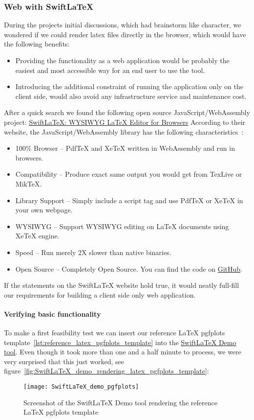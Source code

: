 \subsubsection{Web with SwiftLaTeX}
During the projects initial discussions, which had brainstorm like character, we wondered if we could render latex files directly in the browser, which would have the following benefits:
\begin{itemize}
    \item Providing the functionality as a web application would be probably the easiest and most accessible way for an end user to use the tool.
    \item Introducing the additional constraint of running the application only on the client side, would also avoid any infrastructure service and maintenance cost.
\end{itemize}
After a quick search we found the following open source JavaScript/WebAssembly project: \href{https://www.swiftlatex.com/}{SwiftLaTeX: WYSIWYG LaTeX Editor for Browsers}
According to their website, the JavaScript/WebAssembly library has the following characteristics~\cite{swiftlatex_website}:
\begin{itemize}
    \item 100\% Browser – PdfTeX and XeTeX written in WebAssembly and run in browsers.
    \item Compatibility – Produce exact same output you would get from TexLive or MikTeX\@.
    \item Library Support – Simply include a script tag and use PdfTeX or XeTeX in your own webpage.
    \item WYSIWYG – Support WYSIWYG editing on LaTeX documents using XeTeX engine.
    \item Speed – Run merely 2X slower than native binaries.
    \item Open Source – Completely Open Source. You can find the code on \href{https://github.com/SwiftLaTeX/SwiftLaTeX/}{GitHub}.
\end{itemize}
If the statements on the SwiftLaTeX website hold true, it would neatly full-fill our requirements for building a client side only web application.

\paragraph{Verifying basic functionality}
To make a first feasibility test we can insert our reference LaTeX pgfplots template~\autoref{lst:reference_latex_pgfplots_template} into the \href{https://www.SwiftLaTeX.com/\#demo}{SwiftLaTeX Demo tool}.
Even though it took more than one and a half minute to process, we were very surprised that this just worked, see figure~\autoref{fig:SwiftLaTeX_demo_rendering_latex_pgfplots_template}:
\begin{figure}[H]
    \centering
    \texttt{[image: SwiftLaTeX\_demo\_pgfplots]}
    \caption{Screenshot of the SwiftLaTeX Demo tool rendering the reference LaTeX pgfplots template}\label{fig:SwiftLaTeX_demo_rendering_latex_pgfplots_template}
\end{figure}

